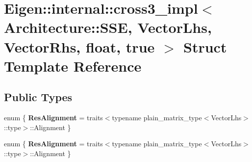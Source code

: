 \hypertarget{struct_eigen_1_1internal_1_1cross3__impl_3_01_architecture_1_1_s_s_e_00_01_vector_lhs_00_01_vect981fca9d3c0a247b027e5ff23e43a093}{}\section{Eigen\+:\+:internal\+:\+:cross3\+\_\+impl$<$ Architecture\+:\+:S\+SE, Vector\+Lhs, Vector\+Rhs, float, true $>$ Struct Template Reference}
\label{struct_eigen_1_1internal_1_1cross3__impl_3_01_architecture_1_1_s_s_e_00_01_vector_lhs_00_01_vect981fca9d3c0a247b027e5ff23e43a093}
\subsection*{Public Types}
\begin{DoxyCompactItemize}
\item 
\mbox{\label{struct_eigen_1_1internal_1_1cross3__impl_3_01_architecture_1_1_s_s_e_00_01_vector_lhs_00_01_vect981fca9d3c0a247b027e5ff23e43a093_aeaa92c2f1edb2c6ab64189313e5eb8d7}} 
enum \{ {\bfseries Res\+Alignment} = traits$<$typename plain\+\_\+matrix\+\_\+type$<$Vector\+Lhs$>$\+:\+:type$>$\+:\+:Alignment
 \}
\item 
\mbox{\label{struct_eigen_1_1internal_1_1cross3__impl_3_01_architecture_1_1_s_s_e_00_01_vector_lhs_00_01_vect981fca9d3c0a247b027e5ff23e43a093_a3d59291691dea814baea825f6ef6e6d2}} 
enum \{ {\bfseries Res\+Alignment} = traits$<$typename plain\+\_\+matrix\+\_\+type$<$Vector\+Lhs$>$\+:\+:type$>$\+:\+:Alignment
 \}
\end{DoxyCompactItemize}
